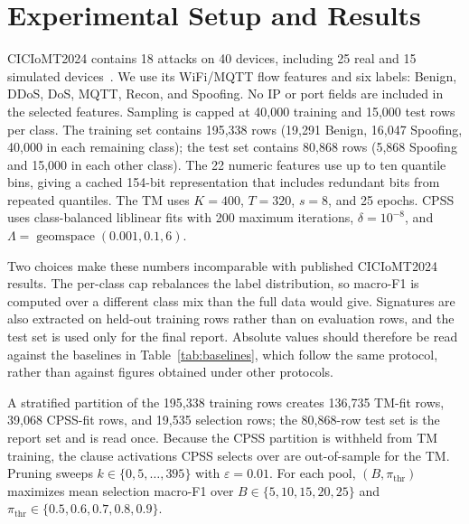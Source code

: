 \documentclass[conference]{IEEEtran}
\begin{document}
\section{Experimental Setup and Results}
\label{sec:setup}
CICIoMT2024 contains 18 attacks on 40 devices, including 25 real
and 15 simulated devices~\cite{dadkhah2024}. We use its WiFi/MQTT
flow features and six labels: Benign, DDoS, DoS, MQTT, Recon, and
Spoofing. No IP or port fields are included in the selected features.
Sampling is capped at 40,000 training and 15,000 test rows per class.
The training set contains 195,338 rows (19,291 Benign, 16,047
Spoofing, 40,000 in each remaining class); the test set contains
80,868 rows (5,868 Spoofing and 15,000 in each other class).
The 22 numeric features use up to ten quantile bins, giving a cached
154-bit representation that includes redundant bits from repeated
quantiles. The TM uses $K=400$, $T=320$, $s=8$, and 25 epochs.
CPSS uses class-balanced liblinear fits with 200 maximum iterations,
$\delta=10^{-8}$, and $\Lambda=\operatorname{geomspace}(0.001,0.1,6)$.

{\color{blue}%
Two choices make these numbers incomparable with published
CICIoMT2024 results. The per-class cap rebalances the label
distribution, so macro-F1 is computed over a different class mix than
the full data would give. Signatures are also extracted on held-out
training rows rather than on evaluation rows, and the test set is used
only for the final report. Absolute values should therefore be read
against the baselines in Table~\ref{tab:baselines}, which follow the
same protocol, rather than against figures obtained under other
protocols.%
}

A stratified partition of the 195,338 training rows creates 136,735
TM-fit rows, 39,068 CPSS-fit rows, and 19,535 selection rows; the
80,868-row test set is the report set and is read once. Because the
CPSS partition is withheld from TM training, the clause activations
CPSS selects over are out-of-sample for the TM.
Pruning sweeps $k\in\{0,5,\ldots,395\}$ with $\varepsilon=0.01$.
For each pool, $(B,\pi_{\mathrm{thr}})$ maximizes mean selection
macro-F1 over $B\in\{5,10,15,20,25\}$ and
$\pi_{\mathrm{thr}}\in\{0.5,0.6,0.7,0.8,0.9\}$.
\end{document}
